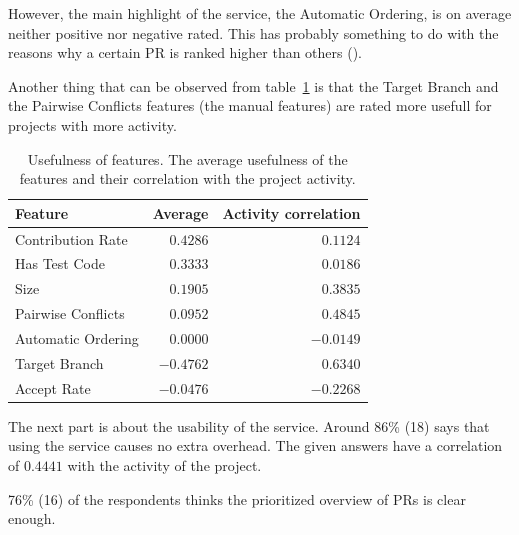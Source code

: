 \documentclass[conference]{IEEEtran}
\begin{document}
However, the main highlight of the service, the Automatic Ordering, is on average neither positive nor negative rated.
This has probably something to do with the reasons why a certain PR is ranked higher than others ().

Another thing that can be observed from table~\ref{tab:usefulness} is that the Target Branch and the Pairwise Conflicts features (the manual features) are rated more usefull for projects with more activity.

\begin{table}
  \centering
  \begin{tabular}{lrr}
    \hline
    \textbf{Feature} & \textbf{Average} & \textbf{Activity correlation} \\
    \hline
    Contribution Rate  &  $0.4286$ &  $0.1124$ \\
    Has Test Code      &  $0.3333$ &  $0.0186$ \\
    Size               &  $0.1905$ &  $0.3835$ \\
    Pairwise Conflicts &  $0.0952$ &  $0.4845$ \\
    Automatic Ordering &  $0.0000$ & $-0.0149$ \\
    Target Branch      & $-0.4762$ &  $0.6340$ \\
    Accept Rate        & $-0.0476$ & $-0.2268$ \\
    \hline
  \end{tabular}
  \caption[Usefulness of features]{Usefulness of features. The average usefulness of the features and their correlation with the project activity.}
  \label{tab:usefulness}
\end{table}

The next part is about the usability of the service.
Around 86\% (18) says that using the service causes no extra overhead.
The given answers have a correlation of $0.4441$ with the activity of the project.

76\% (16) of the respondents thinks the prioritized overview of PRs is clear enough.
\end{document}
